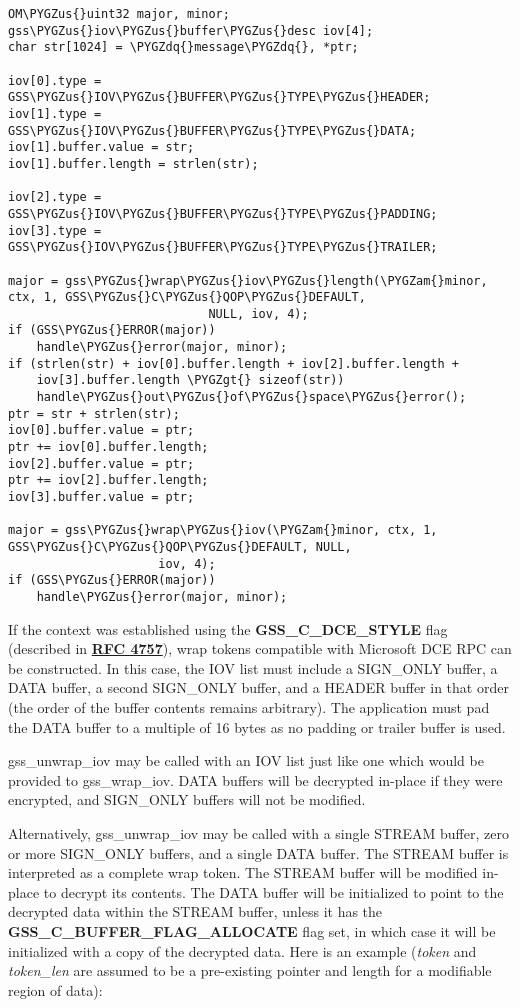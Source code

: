 \documentclass[letterpaper,10pt,english]{sphinxmanual}
\def\PYGZus{\char`\_}
\def\PYGZam{\char`\&}
\def\PYGZgt{\char`\>}
\def\PYGZdq{\char`\"}
\begin{document}
\begin{Verbatim}[commandchars=\\\{\}]
OM\PYGZus{}uint32 major, minor;
gss\PYGZus{}iov\PYGZus{}buffer\PYGZus{}desc iov[4];
char str[1024] = \PYGZdq{}message\PYGZdq{}, *ptr;

iov[0].type = GSS\PYGZus{}IOV\PYGZus{}BUFFER\PYGZus{}TYPE\PYGZus{}HEADER;
iov[1].type = GSS\PYGZus{}IOV\PYGZus{}BUFFER\PYGZus{}TYPE\PYGZus{}DATA;
iov[1].buffer.value = str;
iov[1].buffer.length = strlen(str);

iov[2].type = GSS\PYGZus{}IOV\PYGZus{}BUFFER\PYGZus{}TYPE\PYGZus{}PADDING;
iov[3].type = GSS\PYGZus{}IOV\PYGZus{}BUFFER\PYGZus{}TYPE\PYGZus{}TRAILER;

major = gss\PYGZus{}wrap\PYGZus{}iov\PYGZus{}length(\PYGZam{}minor, ctx, 1, GSS\PYGZus{}C\PYGZus{}QOP\PYGZus{}DEFAULT,
                            NULL, iov, 4);
if (GSS\PYGZus{}ERROR(major))
    handle\PYGZus{}error(major, minor);
if (strlen(str) + iov[0].buffer.length + iov[2].buffer.length +
    iov[3].buffer.length \PYGZgt{} sizeof(str))
    handle\PYGZus{}out\PYGZus{}of\PYGZus{}space\PYGZus{}error();
ptr = str + strlen(str);
iov[0].buffer.value = ptr;
ptr += iov[0].buffer.length;
iov[2].buffer.value = ptr;
ptr += iov[2].buffer.length;
iov[3].buffer.value = ptr;

major = gss\PYGZus{}wrap\PYGZus{}iov(\PYGZam{}minor, ctx, 1, GSS\PYGZus{}C\PYGZus{}QOP\PYGZus{}DEFAULT, NULL,
                     iov, 4);
if (GSS\PYGZus{}ERROR(major))
    handle\PYGZus{}error(major, minor);
\end{Verbatim}

If the context was established using the \textbf{GSS\_C\_DCE\_STYLE} flag
(described in \href{http://tools.ietf.org/html/rfc4757.html}{\textbf{RFC 4757}}), wrap tokens compatible with Microsoft DCE
RPC can be constructed.  In this case, the IOV list must include a
SIGN\_ONLY buffer, a DATA buffer, a second SIGN\_ONLY buffer, and a
HEADER buffer in that order (the order of the buffer contents remains
arbitrary).  The application must pad the DATA buffer to a multiple of
16 bytes as no padding or trailer buffer is used.

gss\_unwrap\_iov may be called with an IOV list just like one which
would be provided to gss\_wrap\_iov.  DATA buffers will be decrypted
in-place if they were encrypted, and SIGN\_ONLY buffers will not be
modified.

Alternatively, gss\_unwrap\_iov may be called with a single STREAM
buffer, zero or more SIGN\_ONLY buffers, and a single DATA buffer.  The
STREAM buffer is interpreted as a complete wrap token.  The STREAM
buffer will be modified in-place to decrypt its contents.  The DATA
buffer will be initialized to point to the decrypted data within the
STREAM buffer, unless it has the \textbf{GSS\_C\_BUFFER\_FLAG\_ALLOCATE} flag
set, in which case it will be initialized with a copy of the decrypted
data.  Here is an example (\emph{token} and \emph{token\_len} are assumed to be a
pre-existing pointer and length for a modifiable region of data):
\end{document}
